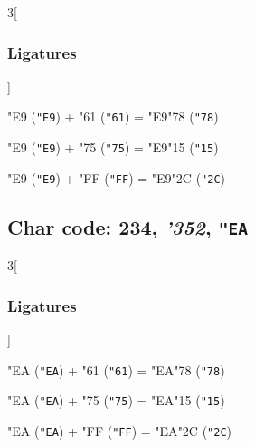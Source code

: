 \documentclass{article}
\newlength{\maxcharwidth}
\begin{document}
\begin{multicols}{3}[\subsubsection{Ligatures}]

{\testfont\char"E9\noboundary} ({\tt"E9}) + {\testfont\char"61\noboundary} ({\tt"61}) = {\testfont\char"E9\noboundary}{\testfont\char"78\noboundary} ({\tt"78}) 

{\testfont\char"E9\noboundary} ({\tt"E9}) + {\testfont\char"75\noboundary} ({\tt"75}) = {\testfont\char"E9\noboundary}{\testfont\char"15\noboundary} ({\tt"15}) 

{\testfont\char"E9\noboundary} ({\tt"E9}) + {\testfont\char"FF\noboundary} ({\tt"FF}) = {\testfont\char"E9\noboundary}{\testfont\char"2C\noboundary} ({\tt"2C}) 

\end{multicols}

\subsection{Char code: 234, {\it'352}, {\tt"EA}}
\label{char_234}


\begin{multicols}{3}[\subsubsection{Ligatures}]

{\testfont\char"EA\noboundary} ({\tt"EA}) + {\testfont\char"61\noboundary} ({\tt"61}) = {\testfont\char"EA\noboundary}{\testfont\char"78\noboundary} ({\tt"78}) 

{\testfont\char"EA\noboundary} ({\tt"EA}) + {\testfont\char"75\noboundary} ({\tt"75}) = {\testfont\char"EA\noboundary}{\testfont\char"15\noboundary} ({\tt"15}) 

{\testfont\char"EA\noboundary} ({\tt"EA}) + {\testfont\char"FF\noboundary} ({\tt"FF}) = {\testfont\char"EA\noboundary}{\testfont\char"2C\noboundary} ({\tt"2C}) 

\end{multicols}
\end{document}
